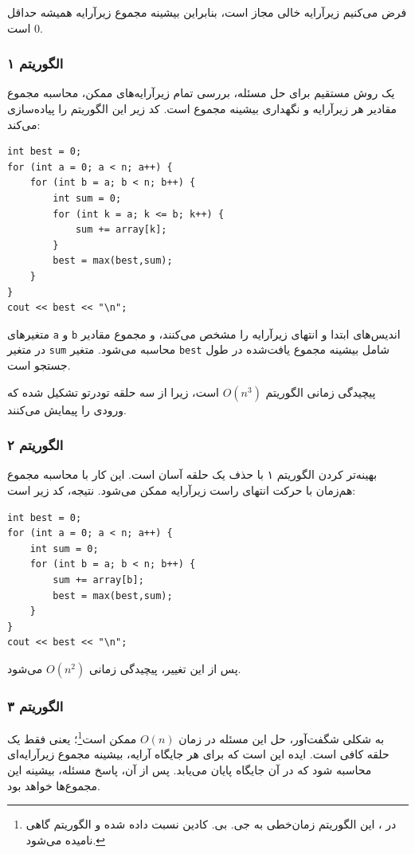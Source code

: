فرض می‌کنیم زیرآرایه خالی مجاز است،
بنابراین بیشینه مجموع زیرآرایه همیشه حداقل $0$ است.

\subsubsection{الگوریتم ۱}

یک روش مستقیم برای حل مسئله،
بررسی تمام زیرآرایه‌های ممکن،
محاسبه مجموع مقادیر هر زیرآرایه و نگهداری
بیشینه مجموع است.
کد زیر این الگوریتم را پیاده‌سازی می‌کند:

\begin{lstlisting}
int best = 0;
for (int a = 0; a < n; a++) {
    for (int b = a; b < n; b++) {
        int sum = 0;
        for (int k = a; k <= b; k++) {
            sum += array[k];
        }
        best = max(best,sum);
    }
}
cout << best << "\n";
\end{lstlisting}

متغیرهای \texttt{a} و \texttt{b} اندیس‌های ابتدا و
انتهای زیرآرایه را مشخص می‌کنند،
و مجموع مقادیر در متغیر \texttt{sum} محاسبه می‌شود.
متغیر \texttt{best} شامل بیشینه مجموع یافت‌شده در طول جستجو است.

پیچیدگی زمانی الگوریتم $O(n^3)$ است، زیرا از سه حلقه تو‌در‌تو تشکیل شده که ورودی را پیمایش می‌کنند.

\subsubsection{الگوریتم ۲}

بهینه‌تر کردن الگوریتم ۱ با حذف یک حلقه آسان است. این کار با محاسبه مجموع هم‌زمان با حرکت انتهای راست زیرآرایه ممکن می‌شود. نتیجه، کد زیر است:

\begin{lstlisting}
int best = 0;
for (int a = 0; a < n; a++) {
    int sum = 0;
    for (int b = a; b < n; b++) {
        sum += array[b];
        best = max(best,sum);
    }
}
cout << best << "\n";
\end{lstlisting}
پس از این تغییر، پیچیدگی زمانی $O(n^2)$ می‌شود.

\subsubsection{الگوریتم ۳}

به شکلی شگفت‌آور، حل این مسئله در زمان $O(n)$ ممکن است\footnote{در \cite{ben86}، این الگوریتم زمان‌خطی به جی. بی. کادین نسبت داده شده و الگوریتم گاهی   نامیده می‌شود.}؛ یعنی فقط یک حلقه کافی است. ایده این است که برای هر جایگاه آرایه، بیشینه مجموع زیرآرایه‌ای محاسبه شود که در آن جایگاه پایان می‌یابد. پس از آن، پاسخ مسئله، بیشینه این مجموع‌ها خواهد بود.

